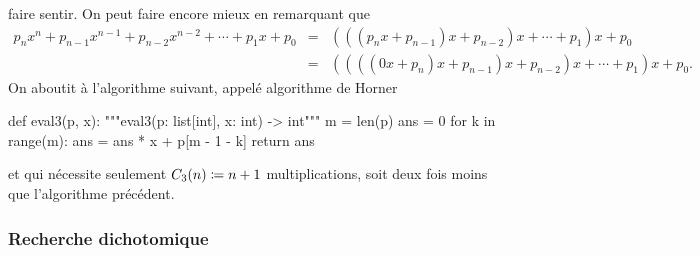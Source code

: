 \documentclass{magnoliaold}
\begin{document}
faire sentir.  On peut faire encore mieux en remarquant que
\begin{eqnarray*}
p_n x^n+p_{n-1}x^{n-1}+p_{n-2}x^{n-2}+\cdots+p_1 x+p_0
&=&(((p_n x+p_{n-1}) x+p_{n-2})x+\cdots+p_1)x+p_0\\
&=&((((0x + p_n) x+p_{n-1}) x+p_{n-2})x+\cdots+p_1)x+p_0.
\end{eqnarray*}
On aboutit à l'algorithme suivant, appelé algorithme de Horner
\begin{pythoncode}
def eval3(p, x):
    """eval3(p: list[int], x: int) -> int"""
    m = len(p)
    ans = 0
    for k in range(m):
        ans = ans * x + p[m - 1 - k]
    return ans
\end{pythoncode}
et qui nécessite seulement $C_3(n)\coloneqq n+1$ multiplications, soit deux fois moins que l'algorithme
précédent.

\subsubsection{Recherche dichotomique}
\end{document}
